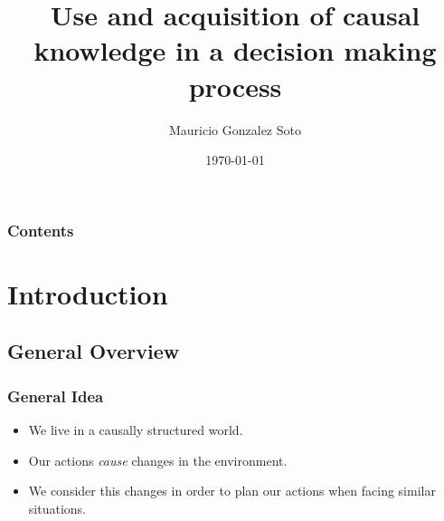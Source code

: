 \documentclass{beamer}
\title[Causally Choosing]{Use and acquisition of causal knowledge in a decision making process} %
\author{Mauricio Gonzalez Soto} %
\institute[INAOE] %
{
Instituto Nacional de Astrofísica Óptica y Electrónica \\ %
\medskip
\textit{mauricio@inaoep.mx} %
}
\date{\today} %
\theoremstyle{plain}
\begin{document}
\begin{frame}
\titlepage %
\end{frame}

\begin{frame}[allowframebreaks]
\frametitle{Contents} %
\tableofcontents[hideallsubsections] %
\end{frame}

%


\section{Introduction}
\subsection{General Overview}
\begin{frame}
\frametitle{General Idea}
\begin{itemize}
\item We live in a causally structured world. 
\item Our actions \textit{cause} changes in the environment.
\item We consider this changes in order to plan our actions when facing similar situations.
\end{itemize}
\end{frame}
\end{document}
